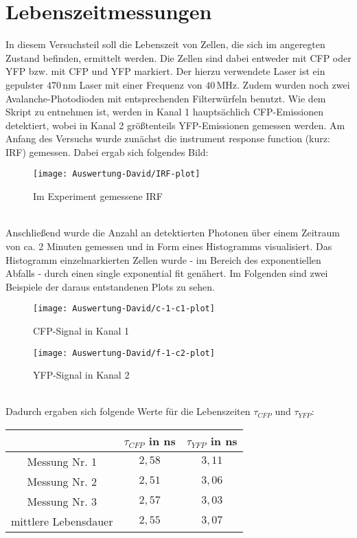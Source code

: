 \section{Lebenszeitmessungen}
	In diesem Versuchsteil soll die Lebenszeit von Zellen, die sich im angeregten Zustand befinden, ermittelt werden. Die Zellen sind dabei entweder mit CFP oder YFP bzw. mit CFP und YFP markiert. Der hierzu verwendete Laser ist ein gepulster $470\,$nm Laser mit einer Frequenz von $40\,$MHz. Zudem wurden noch zwei Avalanche-Photodioden mit entsprechenden Filterwürfeln benutzt. Wie dem Skript zu entnehmen ist, werden in Kanal 1 hauptsächlich CFP-Emissionen detektiert, wobei in Kanal 2 größtenteils YFP-Emissionen gemessen werden. Am Anfang des Versuchs wurde zunächst die instrument response function (kurz: IRF) gemessen. Dabei ergab sich folgendes Bild:
	\begin{figure}[h]
		\centering
		\texttt{[image: Auswertung-David/IRF-plot]}
		\caption{Im Experiment gemessene IRF}
		\label{IRF}
	\end{figure}\\
	Anschließend wurde die Anzahl an detektierten Photonen über einem Zeitraum von ca. 2 Minuten gemessen und in Form eines Histogramms visualisiert. Das Histogramm einzelmarkierten Zellen wurde - im Bereich des exponentiellen Abfalls - durch einen single exponential fit genähert. Im Folgenden sind zwei Beispiele der daraus entstandenen Plots zu sehen.\\
	\begin{figure}[h]
		\begin{minipage}{.4\linewidth} %
			\texttt{[image: Auswertung-David/c-1-c1-plot]}
			\caption{CFP-Signal in Kanal 1}
		\end{minipage}
		\hspace{.1\linewidth}%
		\begin{minipage}{.4\linewidth} %
			\texttt{[image: Auswertung-David/f-1-c2-plot]}
			\caption{YFP-Signal in Kanal 2}
		\end{minipage}
	\end{figure}\\
Dadurch ergaben sich folgende Werte für die Lebenszeiten $\tau_{CFP}$ und $\tau_{YFP}$:\\
\begin{center} 
\begin{tabular}[c]{ccc}
	\hline
	 & $\tau_{CFP}$ in ns & $\tau_{YFP}$ in ns \\
	\hline
	Messung Nr. 1 & $2,58$ & $3,11$ \\
	Messung Nr. 2 & $2,51$ & $3,06$\\
	Messung Nr. 3 & $2,57$ & $3,03$\\
	\hline
	mittlere Lebensdauer & $2,55$ & $3,07$\\
	\hline
\end{tabular}\\
\end{center}
